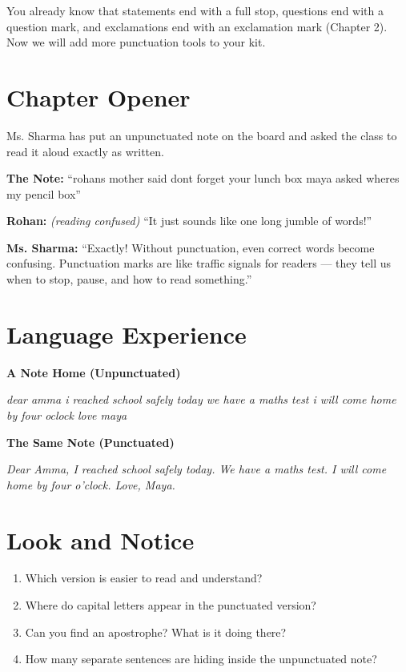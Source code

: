 \begin{rememberbox}
You already know that statements end with a full stop, questions end with a question mark, and exclamations end with an exclamation mark (Chapter 2). Now we will add more punctuation tools to your kit.
\end{rememberbox}

\section{Chapter Opener}
Ms. Sharma has put an unpunctuated note on the board and asked the class to read it aloud exactly as written.

\textbf{The Note:} ``rohans mother said dont forget your lunch box maya asked wheres my pencil box''

\textbf{Rohan:} \textit{(reading confused)} ``It just sounds like one long jumble of words!''

\textbf{Ms. Sharma:} ``Exactly! Without punctuation, even correct words become confusing. Punctuation marks are like traffic signals for readers --- they tell us when to stop, pause, and how to read something.''

\section{Language Experience}
\textbf{A Note Home (Unpunctuated)}

\textit{dear amma i reached school safely today we have a maths test i will come home by four oclock love maya}

\textbf{The Same Note (Punctuated)}

\textit{Dear Amma, I reached school safely today. We have a maths test. I will come home by four o'clock. Love, Maya.}

\section{Look and Notice}
\begin{thinkbox}
\begin{enumerate}
    \item Which version is easier to read and understand?
    \item Where do capital letters appear in the punctuated version?
    \item Can you find an apostrophe? What is it doing there?
    \item How many separate sentences are hiding inside the unpunctuated note?
\end{enumerate}
\end{thinkbox}

